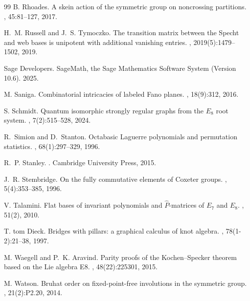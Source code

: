 \documentclass[11pt]{amsart}
\theoremstyle{plain}
\theoremstyle{definition}
\theoremstyle{remark}
\numberwithin{equation}{subsection}
\begin{document}
\begin{thebibliography}{99}
B. Rhoades.
\newblock A skein action of the symmetric group on noncrossing partitions.
, 45:81--127, 2017.

H.~M. Russell and J.~S. Tymoczko.
\newblock The transition matrix between the {S}pecht and web bases is unipotent
  with additional vanishing entries.
, 2019(5):1479--1502,
  2019.
  
Sage Developers.
\newblock SageMath, the {S}age {M}athematics {S}oftware {S}ystem ({V}ersion 10.6). 2025.

M. Saniga.
\newblock Combinatorial intricacies of labeled {F}ano planes.
, 18(9):312, 2016.

S. Schmidt.
\newblock Quantum isomorphic strongly regular graphs from the ${E}_8$ root
  system.
, 7(2):515--528, 2024.

R.~Simion and D.~Stanton.
\newblock Octabasic {L}aguerre polynomials and permutation statistics.
,
  68(1):297--329, 1996.

R.~P. Stanley.
.
\newblock Cambridge University Press, 2015.

J.~R. Stembridge.
\newblock On the fully commutative elements of {C}oxeter groups.
, 5(4):353--385, 1996.

V. Talamini.
\newblock Flat bases of invariant polynomials and {$\hat{P}$}-matrices of
  ${E}_7$ and ${E}_8$.
, 51(2), 2010.

T. tom Dieck.
\newblock Bridges with pillars: a graphical calculus of knot algebra.
, 78(1-2):21--38, 1997.

M. Waegell and P.~K. Aravind.
\newblock Parity proofs of the {K}ochen--{S}pecker theorem based on the {L}ie
  algebra {E}8.
,
  48(22):225301, 2015.

M. Watson.
\newblock Bruhat order on fixed-point-free involutions in the symmetric group.
, 21(2):P2.20, 2014.







\end{thebibliography}
\end{document}
